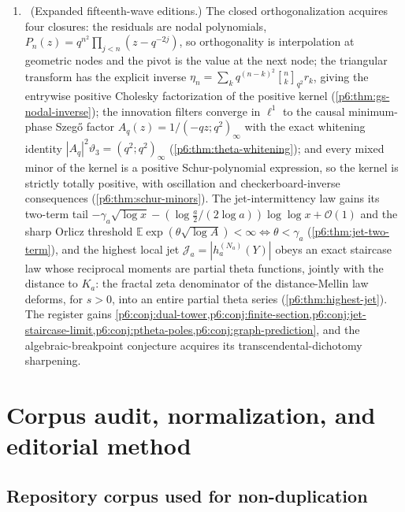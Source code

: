 \documentclass[11pt,oneside]{article}
\numberwithin{equation}{section}
\theoremstyle{definition}
\theoremstyle{remark}
\newcommand{\E}{\mathbb E}
\newcommand{\bigO}{\mathcal O}
\newcommand{\qbinom}[3]{\genfrac{[}{]}{0pt}{}{#1}{#2}_{#3}}
\begin{document}
\begin{enumerate}
\item \newflag\ (Expanded fifteenth-wave editions.)  The closed
orthogonalization acquires four closures: the residuals are nodal
polynomials, $P_n(z)=q^{n^2}\prod_{j<n}(z-q^{-2j})$, so orthogonality is
interpolation at geometric nodes and the pivot is the value at the next
node; the triangular transform has the explicit inverse
$\eta_n=\sum_kq^{(n-k)^2}\qbinom{n}{k}{q^2}r_k$, giving the entrywise
positive Cholesky factorization of the positive kernel
(\cref{p6:thm:gs-nodal-inverse}); the innovation filters converge in
$\ell^1$ to the causal minimum-phase Szeg\H{o} factor
$A_q(z)=1/(-qz;q^2)_\infty$ with the exact whitening identity
$|A_q|^2\vartheta_3=(q^2;q^2)_\infty$
(\cref{p6:thm:theta-whitening}); and every mixed minor of the kernel is a
positive Schur-polynomial expression, so the kernel is strictly totally
positive, with oscillation and checkerboard-inverse consequences
(\cref{p6:thm:schur-minors}).  The jet-intermittency law gains its
two-term tail
$-\gamma_a\sqrt{\log x}-(\log\tfrac a2/(2\log a))\log\log x+\bigO(1)$ and
the sharp Orlicz threshold
$\E\exp(\theta\sqrt{\log A})<\infty\iff\theta<\gamma_a$
(\cref{p6:thm:jet-two-term}), and the highest local jet
$\mathcal J_a=|h_a^{(N_a)}(Y)|$ obeys an exact staircase law whose
reciprocal moments are partial theta functions, jointly with the distance
to $K_a$: the fractal zeta denominator of the distance-Mellin law
deforms, for $s>0$, into an entire partial theta series
(\cref{p6:thm:highest-jet}).  The register gains
\cref{p6:conj:dual-tower,p6:conj:finite-section,p6:conj:jet-staircase-limit,p6:conj:ptheta-poles,p6:conj:graph-prediction},
and the algebraic-breakpoint conjecture acquires its
transcendental-dichotomy sharpening.
\end{enumerate}

\section{Corpus audit, normalization, and editorial method}

\subsection{Repository corpus used for non-duplication}
\end{document}
